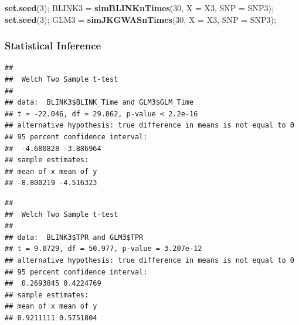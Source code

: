 \documentclass[
]{article}
\newenvironment{Shaded}{\begin{snugshade}}{\end{snugshade}}
\newcommand{\CommentTok}[1]{\textcolor[rgb]{0.56,0.35,0.01}{\textit{#1}}}
\newcommand{\DataTypeTok}[1]{\textcolor[rgb]{0.13,0.29,0.53}{#1}}
\newcommand{\DecValTok}[1]{\textcolor[rgb]{0.00,0.00,0.81}{#1}}
\newcommand{\KeywordTok}[1]{\textcolor[rgb]{0.13,0.29,0.53}{\textbf{#1}}}
\newcommand{\NormalTok}[1]{#1}
\newcommand{\OperatorTok}[1]{\textcolor[rgb]{0.81,0.36,0.00}{\textbf{#1}}}
\newcommand{\StringTok}[1]{\textcolor[rgb]{0.31,0.60,0.02}{#1}}
\begin{document}
\begin{Shaded}
\begin{Highlighting}[]
\KeywordTok{set.seed}\NormalTok{(}\DecValTok{3}\NormalTok{);}
\NormalTok{BLINK3 =}\StringTok{ }\KeywordTok{simBLINKnTimes}\NormalTok{(}\DecValTok{30}\NormalTok{, }\DataTypeTok{X =}\NormalTok{ X3, }\DataTypeTok{SNP =}\NormalTok{ SNP3);}
\KeywordTok{set.seed}\NormalTok{(}\DecValTok{3}\NormalTok{);}
\NormalTok{GLM3 =}\StringTok{ }\KeywordTok{simJKGWASnTimes}\NormalTok{(}\DecValTok{30}\NormalTok{, }\DataTypeTok{X =}\NormalTok{ X3, }\DataTypeTok{SNP =}\NormalTok{ SNP3);}
\end{Highlighting}
\end{Shaded}

\hypertarget{statistical-inference-3}{%
\subsubsection{Statistical Inference}\label{statistical-inference-3}}

\begin{Shaded}
\end{Shaded}

\begin{verbatim}
## 
##  Welch Two Sample t-test
## 
## data:  BLINK3$BLINK_Time and GLM3$GLM_Time
## t = -22.046, df = 29.862, p-value < 2.2e-16
## alternative hypothesis: true difference in means is not equal to 0
## 95 percent confidence interval:
##  -4.680828 -3.886964
## sample estimates:
## mean of x mean of y 
## -8.800219 -4.516323
\end{verbatim}

\begin{Shaded}
\end{Shaded}

\begin{verbatim}
## 
##  Welch Two Sample t-test
## 
## data:  BLINK3$TPR and GLM3$TPR
## t = 9.0729, df = 50.977, p-value = 3.207e-12
## alternative hypothesis: true difference in means is not equal to 0
## 95 percent confidence interval:
##  0.2693845 0.4224769
## sample estimates:
## mean of x mean of y 
## 0.9211111 0.5751804
\end{verbatim}
\end{document}

